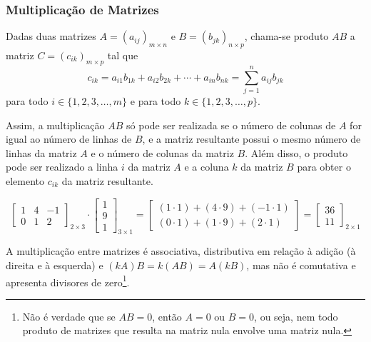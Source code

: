 \subsubsection{Multiplicação de Matrizes}
\begin{df}
Dadas duas matrizes $A=(a_{ij})_{m \times n}$ e $B=(b_{jk})_{n \times p}$, chama-se produto $AB$ a matriz $C=(c_{ik})_{m\times p}$ tal que \[c_{ik}=a_{i1}b_{1k}+a_{i2}b_{2k}+\cdots +a_{in}b_{nk}=\sum_{j=1}^{n}a_{ij}b_{jk}\]
para todo $i \in \{1,2,3,\dots, m\}$ e para todo $k \in \{1,2,3,\dots, p\}$.
\end{df}
Assim, a multiplicação $AB$ só pode ser realizada se o número de colunas de $A$ for igual ao número de linhas de $B$, e a matriz resultante possui o mesmo número de linhas da matriz $A$ e o número de colunas da matriz $B$. Além disso, o produto pode ser realizado a linha $i$ da matriz $A$ e a coluna $k$ da matriz $B$ para obter o elemento $c_{ik}$ da matriz resultante.
\begin{exemplo}
\[\begin{bmatrix}
1 & 4 & -1 \\
0 & 1 & 2
\end{bmatrix}_{2\times3} \cdot \begin{bmatrix}
1 \\
9 \\
1
\end{bmatrix}_{3\times1}=\begin{bmatrix}
(1\cdot1)+(4\cdot9)+(-1\cdot1)\\
(0\cdot1)+(1\cdot9)+(2\cdot1)
\end{bmatrix}=\begin{bmatrix}
36\\
11
\end{bmatrix}_{2\times1}\]
\end{exemplo}
A multiplicação entre matrizes é associativa, distributiva em relação à adição (à direita e à esquerda) e $(kA)B=k(AB)=A(kB)$, mas não é comutativa e apresenta divisores de zero\footnote{Não é verdade que se $AB=0$, então $A=0$ ou $B=0$, ou seja, nem todo produto de matrizes que resulta na matriz nula envolve uma matriz nula.}.

